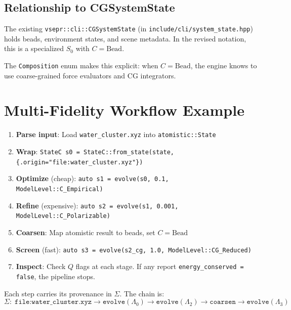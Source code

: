 \documentclass[11pt]{article}
\begin{document}
\subsection{Relationship to CGSystemState}

The existing \texttt{vsepr::cli::CGSystemState} (in \texttt{include/cli/system\_state.hpp}) holds beads, environment states, and scene metadata. In the revised notation, this is a specialized $S_0$ with $C = \text{Bead}$.

The \texttt{Composition} enum makes this explicit: when $C = \text{Bead}$, the engine knows to use coarse-grained force evaluators and CG integrators.

\section{Multi-Fidelity Workflow Example}

\begin{enumerate}
  \item \textbf{Parse input}: Load \texttt{water\_cluster.xyz} into \texttt{atomistic::State}
  \item \textbf{Wrap}: \texttt{StateC s0 = StateC::from\_state(state, \{.origin="file:water\_cluster.xyz"\})}
  \item \textbf{Optimize} (cheap): \texttt{auto s1 = evolve(s0, 0.1, ModelLevel::C\_Empirical)}
  \item \textbf{Refine} (expensive): \texttt{auto s2 = evolve(s1, 0.001, ModelLevel::C\_Polarizable)}
  \item \textbf{Coarsen}: Map atomistic result to beads, set $C = \text{Bead}$
  \item \textbf{Screen} (fast): \texttt{auto s3 = evolve(s2\_cg, 1.0, ModelLevel::CG\_Reduced)}
  \item \textbf{Inspect}: Check $Q$ flags at each stage. If any report \texttt{energy\_conserved = false}, the pipeline stops.
\end{enumerate}

Each step carries its provenance in $\Sigma$. The chain is:
\begin{equation}
\Sigma: \; \texttt{file:water\_cluster.xyz} \to \texttt{evolve}(\Lambda_0) \to \texttt{evolve}(\Lambda_2) \to \texttt{coarsen} \to \texttt{evolve}(\Lambda_3)
\end{equation}

\end{document}
